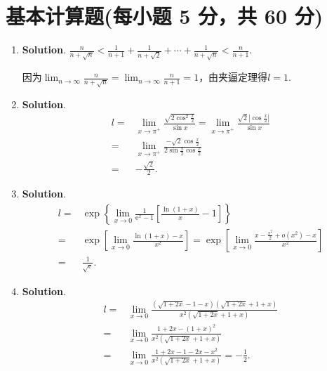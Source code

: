 \documentclass[../main.tex]{subfiles}
\begin{document}
\section{基本计算题(每小题 5 分，共 60 分)}
\begin{enumerate}
    \item \textbf{Solution}. $\frac{n}{n+\sqrt{n}}<\frac{1}{n+1}+\frac{1}{n+\sqrt{2}}
              +\cdots+\frac{1}{n+\sqrt{n}}<\frac{n}{n+1}$.

          因为$\lim_{n\to\infty}\frac{n}{n+\sqrt{n}}=\lim_{n\to\infty}\frac{n}{n+1}=1$，由夹逼定理得$l
              =1$.

    \item \textbf{Solution}.
          \[
              \begin{aligned}
                  l = {} & \lim_{x\to \pi^+}\frac{\sqrt{2\cos^2 \frac{x}{2}}}{\sin x}=\lim_{x\to\pi^+}\frac{\sqrt{2}\left|\cos\frac{x}{2}\right|}{\sin x} \\
                  = {}   & \lim_{x\to\pi^+}\frac{-\sqrt{2}\cos\frac{x}{2}}{2\sin \frac{x}{2}\cos \frac{x}{2}}                                             \\
                  = {}   & -\frac{\sqrt{2}}{2}.
              \end{aligned}
          \]

    \item \textbf{Solution}.
          \[
              \begin{aligned}
                  l= {} & \exp\left\{\lim_{x\to0}\frac{1}{\mathrm{e}^x-1}\left[\frac{\ln(1+x)}{x}-1\right]\right\}                              \\
                  = {}  & \exp\left[\lim_{x\to0}\frac{\ln(1+x)-x}{x^2}\right]=\exp\left[\lim_{x\to0}\frac{x-\frac{x^2}{2}+o(x^2)-x}{x^2}\right] \\
                  = {}  & \frac{1}{\sqrt{\mathrm{e}}}.
              \end{aligned}
          \]

    \item \textbf{Solution}.
          \[
              \begin{aligned}
                  l = {} & \lim_{x\to0}\frac{\left(\sqrt{1+2x}-1-x\right)\left(\sqrt{1+2x}+1+x\right)}{x^2\left(\sqrt{1+2x}+1+x\right)} \\
                  = {}   & \lim_{x\to0}\frac{1+2x-(1+x)^2}{x^2\left(\sqrt{1+2x}+1+x\right)}                                             \\
                  = {}   & \lim_{x\to0}\frac{1+2x-1-2x-x^2}{x^2\left(\sqrt{1+2x}+1+x\right)}=-\frac{1}{2}.
              \end{aligned}
          \]


\end{enumerate}
\end{document}
